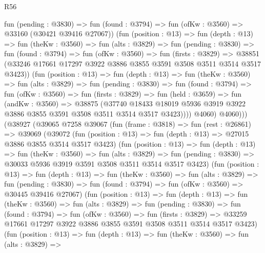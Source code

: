 \begin{lexlean}{R56}
\begin{coremodule}
                fun (pending : @3830) =>
                fun (found : @3794) => fun (ofKw : @3560) => @33160 (@30421 @39416 @27067))
                (fun (position : @13) =>
                fun (depth : @13) =>
                fun (theKw : @3560) =>
                fun (alts : @3829) =>
                fun (pending : @3830) =>
                fun (found : @3794) =>
                fun (ofKw : @3560) =>
                fun (firsts : @3829) =>
                @38851 (@33246 @17661 @17297 @3922 @3886 @3855 @3591 @3508 @3511 @3514 @3517 @3423))
                (fun (position : @13) =>
                fun (depth : @13) =>
                fun (theKw : @3560) =>
                fun (alts : @3829) =>
                fun (pending : @3830) =>
                fun (found : @3794) =>
                fun (ofKw : @3560) =>
                fun (firsts : @3829) =>
                fun (held : @3659) =>
                fun (andKw : @3560) =>
                @38875
                  (@37740
                    @18433
                    @18019
                    @5936
                    @3919
                    @3922
                    @3886
                    @3855
                    @3591
                    @3508
                    @3511
                    @3514
                    @3517
                    @3423))))
            @4060)
          @4060)))
    (@38927
      (@39065
        @7258
        @39067
        (fun (frame : @3818) =>
        fun (rest : @26861) =>
        @39069
          (@39072
            (fun (position : @13) => fun (depth : @13) => @27015 @3886 @3855 @3514 @3517 @3423)
            (fun (position : @13) =>
            fun (depth : @13) =>
            fun (theKw : @3560) =>
            fun (alts : @3829) =>
            fun (pending : @3830) => @30033 @5936 @3919 @3591 @3508 @3511 @3514 @3517 @3423)
            (fun (position : @13) =>
            fun (depth : @13) =>
            fun (theKw : @3560) =>
            fun (alts : @3829) =>
            fun (pending : @3830) =>
            fun (found : @3794) => fun (ofKw : @3560) => @30445 @39416 @27067)
            (fun (position : @13) =>
            fun (depth : @13) =>
            fun (theKw : @3560) =>
            fun (alts : @3829) =>
            fun (pending : @3830) =>
            fun (found : @3794) =>
            fun (ofKw : @3560) =>
            fun (firsts : @3829) =>
            @33259 @17661 @17297 @3922 @3886 @3855 @3591 @3508 @3511 @3514 @3517 @3423)
            (fun (position : @13) =>
            fun (depth : @13) =>
            fun (theKw : @3560) =>
            fun (alts : @3829) =>

\end{coremodule}
\end{lexlean}

